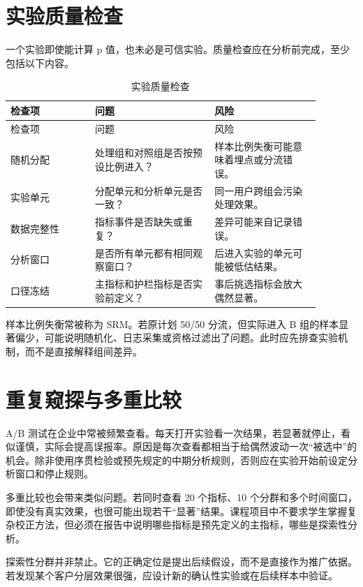 \documentclass[UTF8,fontset=fandol,openany,zihao=-4]{ctexbook}
\begin{document}
\section{实验质量检查}

一个实验即使能计算 p 值，也未必是可信实验。质量检查应在分析前完成，至少包括以下内容。

\begin{longtable}{>{\raggedright\arraybackslash}p{0.24\linewidth}>{\raggedright\arraybackslash}p{0.34\linewidth}>{\raggedright\arraybackslash}p{0.30\linewidth}}
\caption{实验质量检查}\\
\toprule
检查项 & 问题 & 风险\\
\midrule
\endfirsthead
\toprule
检查项 & 问题 & 风险\\
\midrule
\endhead
随机分配 & 处理组和对照组是否按预设比例进入？ & 样本比例失衡可能意味着埋点或分流错误。\\
实验单元 & 分配单元和分析单元是否一致？ & 同一用户跨组会污染处理效果。\\
数据完整性 & 指标事件是否缺失或重复？ & 差异可能来自记录错误。\\
分析窗口 & 是否所有单元都有相同观察窗口？ & 后进入实验的单元可能被低估结果。\\
口径冻结 & 主指标和护栏指标是否实验前定义？ & 事后挑选指标会放大偶然显著。\\
\bottomrule
\end{longtable}

样本比例失衡常被称为 SRM。若原计划 50/50 分流，但实际进入 B 组的样本显著偏少，可能说明随机化、日志采集或资格过滤出了问题。此时应先排查实验机制，而不是直接解释组间差异。

\section{重复窥探与多重比较}

A/B 测试在企业中常被频繁查看。每天打开实验看一次结果，若显著就停止，看似谨慎，实际会提高误报率。原因是每次查看都相当于给偶然波动一次“被选中”的机会。除非使用序贯检验或预先规定的中期分析规则，否则应在实验开始前设定分析窗口和停止规则。

多重比较也会带来类似问题。若同时查看 20 个指标、10 个分群和多个时间窗口，即使没有真实效果，也很可能出现若干“显著”结果。课程项目中不要求学生掌握复杂校正方法，但必须在报告中说明哪些指标是预先定义的主指标，哪些是探索性分析。

\begin{remark}
探索性分群并非禁止。它的正确定位是提出后续假设，而不是直接作为推广依据。若发现某个客户分层效果很强，应设计新的确认性实验或在后续样本中验证。
\end{remark}
\end{document}
